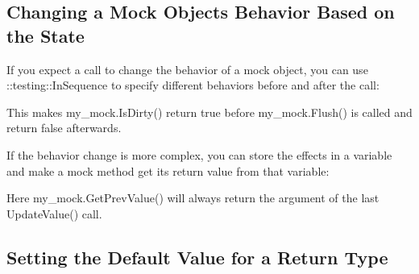 \subsection*{Changing a Mock Object\textquotesingle{}s Behavior Based on the State}

If you expect a call to change the behavior of a mock object, you can use {\ttfamily \+::testing\+::\+In\+Sequence} to specify different behaviors before and after the call\+:


\begin{DoxyCode}{0}
\DoxyCodeLine{}
\DoxyCodeLine{  \{}
\DoxyCodeLine{  \}}
\end{DoxyCode}


This makes {\ttfamily my\+\_\+mock.\+Is\+Dirty()} return {\ttfamily true} before {\ttfamily my\+\_\+mock.\+Flush()} is called and return {\ttfamily false} afterwards.

If the behavior change is more complex, you can store the effects in a variable and make a mock method get its return value from that variable\+:


\begin{DoxyCode}{0}
\DoxyCodeLine{}
\end{DoxyCode}


Here {\ttfamily my\+\_\+mock.\+Get\+Prev\+Value()} will always return the argument of the last {\ttfamily Update\+Value()} call.

\subsection*{Setting the Default Value for a Return Type}

